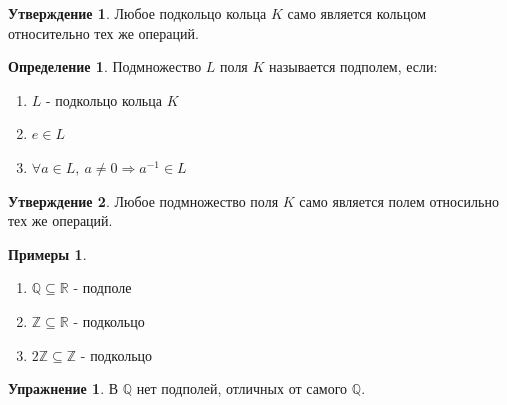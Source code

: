 \documentclass[a4paper, 12pt]{article}
\newcommand{\R}{\mathbb R}
\newcommand{\Q}{\mathbb Q}
\newcommand{\Z}{\mathbb Z}
\newcommand\tab[1][.5cm]{\hspace*{#1}}
\theoremstyle{definition}
\newtheorem*{definition}{Определение}
\newtheorem*{subtheorem}{Утверждение}
\newtheorem*{example}{Примеры}
\newtheorem*{Exercise}{Упражнение}
\begin{document}
  \begin{subtheorem}
    Любое подкольцо кольца $K$ само является кольцом относительно тех же операций.  
  \end{subtheorem}
  \begin{definition}
    Подмножество $L$ поля $K$ называется подполем, если:
    \begin{enumerate}
      \item $L$ - подкольцо кольца $K$
      \item $e \in L$
      \item $\forall a \in L, \ a \neq 0 \Longrightarrow a^{-1} \in L$   
    \end{enumerate}
  \end{definition}
  \begin{subtheorem}
    Любое подмножество поля $K$ само является полем относильно тех же операций.  
  \end{subtheorem}  
  \begin{example} \tab
    \begin{enumerate}
      \item $\Q \subseteq \R$ - подполе
      \item $\Z \subseteq \R$ - подкольцо
      \item $2\Z \subseteq \Z$ - подкольцо
    \end{enumerate}
  \end{example} 
  \begin{Exercise}
    В $\Q$ нет подполей, отличных от самого $\Q$.
  \end{Exercise}
\end{document}
